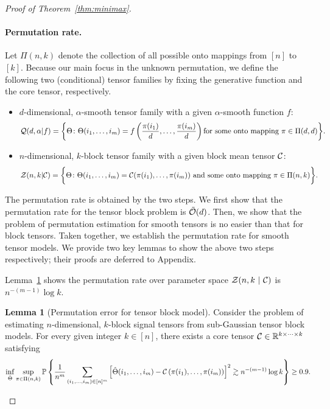 \documentclass[11pt]{article}
\theoremstyle{definition}
\newtheorem{lem}[thm]{Lemma}
\begin{document}
\begin{proof}[Proof of Theorem~\ref{thm:minimax}]
\paragraph{Permutation rate.} Let $\Pi(n,k)$ denote the collection of all possible onto mappings from $[n]$ to $[k]$. Because our main focus in the unknown permutation, we define the following two (conditional) tensor families by fixing the generative function and the core tensor, respectively. 
\begin{itemize} 
\item $d$-dimensional, $\alpha$-smooth tensor family with a given $\alpha$-smooth function $f$:
\begin{align}
\mathcal{Q}(d, \alpha | f)=\bigg\{\Theta\colon \Theta(i_1,\ldots,i_m)=f\left({\pi(i_1)\over d},\ldots,{\pi(i_m)\over d}\right) 
\text{for some onto mapping } \pi\in \Pi(d,d) \bigg\}.
\end{align}
\item $n$-dimensional, $k$-block tensor family with a given block mean tensor $\mathcal{C}$:
\begin{align}
\mathcal{Z}(n,k | \mathcal{C})&=\bigg \{\Theta\colon \Theta(i_1,\ldots,i_m)=\mathcal{C}(\pi(i_1),\ldots,\pi(i_m))
\text{ and some onto mapping }\pi\in \Pi(n,k)\bigg\}.
\end{align}
\end{itemize} 
The permutation rate is obtained by the two steps. We first show that the permutation rate for the tensor block problem is $\tilde {\mathcal{O}}(d)$. Then, we show that the problem of permutation estimation for smooth tensors is no easier than that for block tensors. Taken together, we establish the permutation rate for smooth tensor models. We provide two key lemmas to show the above two steps respectively; their proofs are deferred to Appendix. 



Lemma~\ref{lem:permutation} shows the permutation rate over parameter space $\mathcal{Z}(n,k\ |\ \mathcal{C})$ is $n^{-(m-1)}\log k$. 
\begin{lem}[Permutation error for tensor block model]\label{lem:permutation}
Consider the problem of estimating $n$-dimensional, $k$-block signal tensors from sub-Gaussian tensor block models.
For every given integer $k\in[n]$, there exists a core tensor $\mathcal{C}\in\mathbb{R}^{k\times \cdots \times k}$ satisfying
\begin{equation}\label{eq:givenC}
\inf_{\hat \Theta}\sup_{\pi \in \Pi(n,k)}\mathbb{P}\left\{{1\over n^m}\sum_{(i_1,\ldots,i_m)\in[n]^m}\left[\hat \Theta(i_1,\ldots,i_m)-\mathcal{C}\left(\pi(i_1),\ldots,\pi(i_m)\right)\right]^2\gtrsim n^{-(m-1)}\log k\right\}\geq 0.9.
\end{equation}
\end{lem}


\end{proof}
\end{document}
